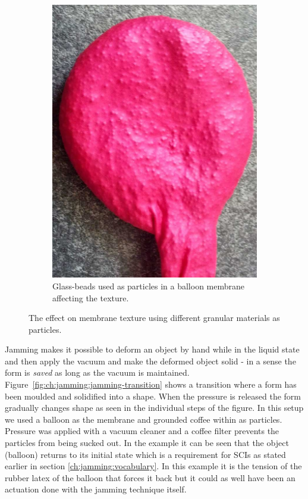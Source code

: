 \begin{figure}[h]
\begin{subfigure}[b]{.44\textwidth}
  \includegraphics[width=\linewidth]{figures/jamming/balloon-glass-beads}
  \caption{Glass-beads used as particles in a balloon membrane affecting the texture.}
\end{subfigure}
\caption{The effect on membrane texture using different granular materials as particles.}
\label{fig:ch:jamming:particles:balloon}
\end{figure}

Jamming makes it possible to deform an object by hand while in the liquid state and then apply the vacuum and make the deformed object solid - in a sense the form is \emph{saved} as long as the vacuum is maintained.
Figure~\ref{fig:ch:jamming:jamming-transition} shows a transition where a form has been moulded and solidified into a shape.
When the pressure is released the form gradually changes shape as seen in the individual steps of the figure.
In this setup we used a balloon as the membrane and grounded coffee within as particles.
Pressure was applied with a vacuum cleaner and a coffee filter prevents the particles from being sucked out.
In the example it can be seen that the object (balloon) returns to its initial state which is a requirement for SCIs as stated earlier in section \ref{ch:jamming:vocabulary}.
In this example it is the tension of the rubber latex of the balloon that forces it back but it could as well have been an actuation done with the jamming technique itself. 

